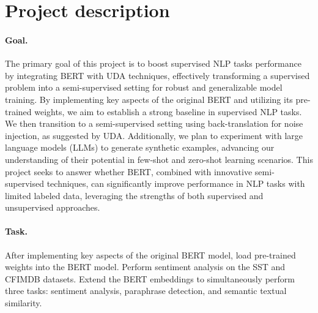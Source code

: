 \documentclass{article}
\begin{document}
\section{Project description}

\paragraph{Goal.} 
The primary goal of this project is to boost supervised NLP tasks performance by 
integrating BERT with UDA techniques, effectively transforming a supervised problem 
into a semi-supervised setting for robust and generalizable model training. By 
implementing key aspects of the original BERT and utilizing its pre-trained weights, 
we aim to establish a strong baseline in supervised NLP tasks. We then transition to 
a semi-supervised setting using back-translation for noise injection, as suggested by 
UDA. Additionally, we plan to experiment with large language models (LLMs) to generate 
synthetic examples, advancing our understanding of their potential in few-shot and 
zero-shot learning scenarios. This project seeks to answer whether BERT, combined with 
innovative semi-supervised techniques, can significantly improve performance in NLP 
tasks with limited labeled data, leveraging the strengths of both supervised and 
unsupervised approaches.

\paragraph{Task.} 
After implementing key aspects of the original BERT model, 
load pre-trained weights into the BERT model. 
Perform sentiment analysis on the SST and CFIMDB datasets. 
Extend the BERT embeddings to simultaneously perform three tasks: 
sentiment analysis, paraphrase detection, and semantic textual similarity.
\end{document}

